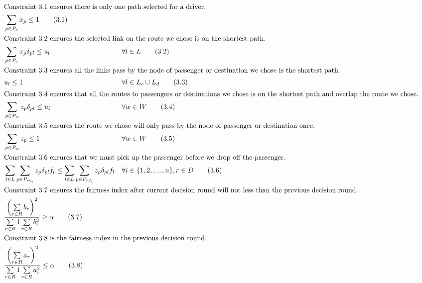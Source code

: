 \begin{align*}
  \intertext{Constraint 3.1 ensures there is only one path selected for a driver.}
  & \sum\limits_{p \in P_r} x_p \leq 1 \tag{3.1} \\
  \intertext{Constraint 3.2 ensures the selected link on the route we chose is on the shortest path.}
  & \sum\limits_{p \in P_r} x_p \delta_{pl} \leq u_l && \forall l \in L \tag{3.2} \\
  \intertext{Constraint 3.3 ensures all the links pass by the node of passenger or destination we chose is the shortest path.}
  & u_l \leq 1 && \forall l \in L_c \cup L_d \tag{3.3} \\
  \intertext{Constraint 3.4 ensures that all the routes to passengers or destinations we chose is on the shortest path and overlap the route we chose.}
  & \sum\limits_{p \in P_w} z_p \delta_{pl} \leq u_l && \forall w \in W \tag{3.4} \\
  \intertext{Constraint 3.5 ensures the route we chose will only pass by the node of passenger or destination once.}
  & \sum\limits_{p \in P_w} z_p \leq 1 && \forall w \in W \tag{3.5} \\
  \intertext{Constraint 3.6 ensures that we must pick up the passenger before we drop off the passenger.}
  & \sum\limits_{l \in L} \sum\limits_{p \in P_{rc_i}} z_p \delta_{pl} f_l \leq \sum\limits_{l \in L} \sum\limits_{p \in P_{rd_i}} z_p \delta_{pl} f_l && \forall i \in \{1,2,,...,n\}, r \in D \tag{3.6} \\
  \intertext{Constraint 3.7 ensures the fairness index after current decision round will not less than the previous decision round.}
  & \frac{\left(\sum\limits_{r \in R} b_r\right)^2}{\sum\limits_{r \in R} 1 \sum\limits_{r \in R} b_r^2} \geq \alpha \tag{3.7} \\
  \intertext{Constraint 3.8 is the fairness index in the previous decision round.}
  & \frac{\left(\sum\limits_{r \in R} a_r\right)^2}{\sum\limits_{r \in R} 1 \sum\limits_{r \in R} a_r^2} \leq \alpha \tag{3.8} \\
\end{align*}